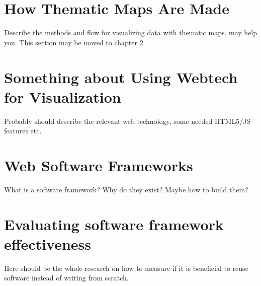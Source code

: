 \section{How Thematic Maps Are Made}

Describe the methods and flow for visualizing data with thematic maps. \citet{schlichtmann_visualization_2002} may help you. This section may be moved to chapter 2

\section{Something about Using Webtech for Visualization}

Probably should describe the relevant web technology, some needed HTML5/JS features etc. 

\section{Web Software Frameworks}

What is a software framework? Why do they exist? Maybe how to build them?

\section{Evaluating software framework effectiveness}

Here should be the whole research on how to measure if it is beneficial to reuse software instead of writing from scratch.
